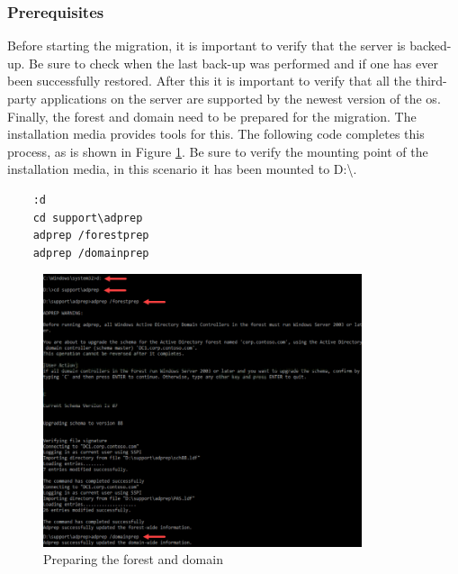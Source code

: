 \subsubsection{Prerequisites}
Before starting the migration, it is important to verify that the server is backed-up. Be sure to check when the last back-up was performed and if one has ever been successfully restored. After this it is important to verify that all the third-party applications on the server are supported by the newest version of the \acrshort{os}. Finally, the forest and domain need to be prepared for the migration. The installation media provides tools for this. The following code completes this process, as is shown in Figure \ref{fig:inplace1}. Be sure to verify the mounting point of the installation media, in this scenario it has been mounted to D:\textbackslash .

\begin{lstlisting}
	:d
	cd support\adprep
	adprep /forestprep
	adprep /domainprep
\end{lstlisting}
\begin{figure}[h]
	\includegraphics[height=8cm]{img/In-Place_WS_1.png}
	\captionsetup{width=0.8\linewidth}
	\centering		
	\caption{Preparing the forest and domain}
	\label{fig:inplace1}
\end{figure}

